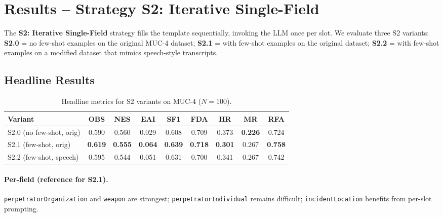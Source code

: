 \section{Results – Strategy S2: Iterative Single-Field}
\label{sec:eval-s2}

The \textbf{S2: Iterative Single-Field} strategy fills the template sequentially, invoking the LLM once per slot.
We evaluate three S2 variants:
\textbf{S2.0} = no few-shot examples on the original MUC-4 dataset;
\textbf{S2.1} = with few-shot examples on the original dataset;
\textbf{S2.2} = with few-shot examples on a modified dataset that mimics speech-style transcripts.

\subsection*{Headline Results}

\begin{table}[h]
    \centering
    \caption{Headline metrics for S2 variants on MUC-4 ($N{=}100$).}
    \label{tab:s2-variants-headline}
    \begin{tabular}{lcccccccc}
        \toprule
        Variant & OBS & NES & EAI & SF1 & FDA & HR & MR & RFA \\
        \midrule
        S2.0 (no few-shot, orig) & 0.590 & 0.560 & 0.029 & 0.608 & 0.709 & 0.373 & \textbf{0.226} & 0.724 \\
        S2.1 (few-shot, orig)    & \textbf{0.619} & \textbf{0.555} & \textbf{0.064} & \textbf{0.639} & \textbf{0.718} & \textbf{0.301} & 0.267 & \textbf{0.758} \\
        S2.2 (few-shot, speech)  & 0.595 & 0.544 & 0.051 & 0.631 & 0.700 & 0.341 & 0.267 & 0.742 \\
        \bottomrule
    \end{tabular}
\end{table}

\paragraph{Per-field (reference for S2.1).}
\texttt{perpetratorOrganization} and \texttt{weapon} are strongest; \texttt{perpetratorIndividual} remains difficult; \texttt{incidentLocation} benefits from per-slot prompting.

